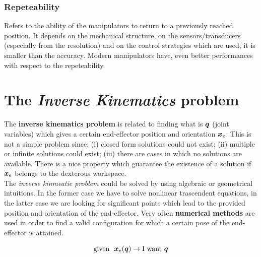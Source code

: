 \subsubsection{Repeteability}
Refers to the ability of the manipulators to return to a previously reached position. It depends on the mechanical structure, on the sensors/transducers (especially from the resolution) and on the control strategies which are used, it is smaller than the accuracy. 
Modern manipulators have, even better performances with respect to the repeteability.

\section{The \textit{Inverse Kinematics} problem} 
The \textbf{inverse kinematics problem} is related to finding what is $\boldsymbol{q}$ (joint variables) which gives a certain end-effector position and orientation $\boldsymbol{x}_e$. This is not a simple problem since: (i) closed form solutions could not exist; (ii) multiple or infinite solutions could exist; (iii) there are cases in which no solutions are available. There is a nice property which guarantee the existence of a solution if $\boldsymbol{x}_e$ belongs to the dexterous workspace. \\
The \textit{inverse kinmeatic problem} could be solved by using algebraic or geometrical intuitions. In the former case we have to solve nonlinear trascendent equations, in the latter case we are looking for significant points which lead to the provided position and orientation of the end-effector. Very often \textbf{numerical methods} are used in order to find a valid configuration for which a certain pose of the end-effector is attained. 

{\Large
\begin{equation}
    \text{given } \ \boldsymbol{x}_e(\boldsymbol{q}) \to \text{I want } \boldsymbol{q} 
\end{equation}
}